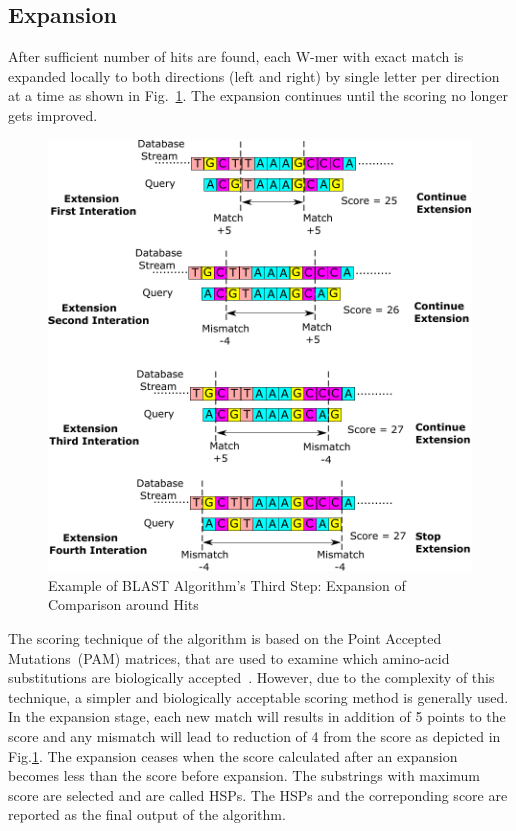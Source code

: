 \subsection{Expansion}
After sufficient number of hits are found, each W-mer with exact match is expanded locally to both directions (left and right) by single letter per direction at a time as shown in Fig.~\ref{fig:step3}. 
The expansion continues until the scoring no longer gets improved.
\begin{figure}[b!]
\centering
\includegraphics[width=\columnwidth]{Figures/Algorithm3.pdf}
\caption{Example of BLAST Algorithm's Third Step: Expansion of Comparison around Hits} \label{fig:step3}
\end{figure}
The scoring technique of the algorithm is based on the Point Accepted Mutations~(PAM) matrices, that are used to examine which amino-acid substitutions are biologically accepted~\cite{sotiriades2007design}. 
However, due to the complexity of this technique, a simpler and biologically acceptable scoring method is generally used. 
In the expansion stage, each new match will results in addition of 5 points to the score and any mismatch will lead to reduction of 4 from the score as depicted in Fig.\ref{fig:step3}.
The expansion ceases when the score calculated after an expansion becomes less than the score before expansion.
The substrings with maximum score are selected and are called HSPs.
The HSPs and the correponding score are reported as the final output of the algorithm.

